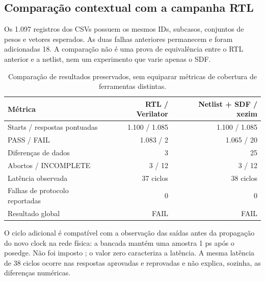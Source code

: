 \documentclass[12pt,a4paper]{article}
\newcommand{\arquivo}[1]{\texttt{\detokenize{#1}}}
\begin{document}
\subsection{Comparação contextual com a campanha RTL}
Os 1.097 registros dos CSVs possuem os mesmos IDs, subcasos, conjuntos de pesos e vetores esperados. As duas falhas anteriores permanecem e foram adicionadas 18. A comparação não é uma prova de equivalência entre o RTL anterior e a netlist, nem um experimento que varie apenas o SDF.

\begin{table}[H]\centering\small
\begin{tabular}{p{8.8cm}rr}\toprule
\textbf{Métrica} & \textbf{RTL / Verilator} & \textbf{Netlist + SDF / xezim}\\\midrule
Starts / respostas pontuadas & 1.100 / 1.085 & 1.100 / 1.085\\
PASS / FAIL & 1.083 / 2 & 1.065 / 20\\
Diferenças de dados & 3 & 25\\
Abortos / INCOMPLETE & 3 / 12 & 3 / 12\\
Latência observada & 37 ciclos & 38 ciclos\\
Falhas de protocolo reportadas & 0 & 0\\
Resultado global & FAIL & FAIL\\\bottomrule
\end{tabular}
\caption{Comparação de resultados preservados, sem equiparar métricas de cobertura de ferramentas distintas.}
\end{table}

\begin{table}[H]\centering\small

\caption{Falhas por cenário nas duas campanhas.}
\end{table}
O ciclo adicional é compatível com a observação das saídas antes da propagação do novo clock na rede física: a bancada mantém uma amostra 1 ps após o posedge. Não foi imposto \arquivo{EXPECTED_LATENCY=37}; o valor zero caracteriza a latência. A mesma latência de 38 ciclos ocorre nas respostas aprovadas e reprovadas e não explica, sozinha, as diferenças numéricas.
\end{document}
